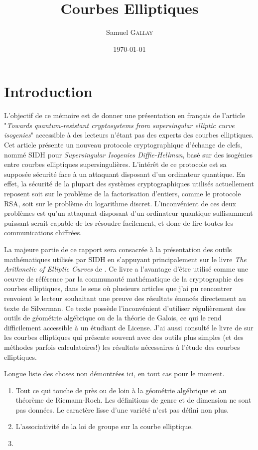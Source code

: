 \documentclass{article}
\title{Courbes Elliptiques}
\author{Samuel \textsc{Gallay}}
\date{\today}
\theoremstyle{plain}%
\theoremstyle{definition}%
\begin{document}
\maketitle

\tableofcontents

\newpage

\section{Introduction}


L'objectif de ce mémoire est de donner une présentation en français de l'article \cite{DeFeo} "\emph{Towards quantum-resistant cryptosystems from supersingular elliptic curve isogenies}" accessible à des lecteurs n'étant pas des experts des courbes elliptiques.
Cet article présente un nouveau protocole cryptographique d'échange de clefs, nommé SIDH pour \emph{Supersingular Isogenies Diffie-Hellman}, basé sur des isogénies entre courbes elliptiques supersingulières. 
L'intérêt de ce protocole est sa supposée sécurité face à un attaquant disposant d'un ordinateur quantique. 
En effet, la sécurité de la plupart des systèmes cryptographiques utilisés actuellement reposent soit sur le problème de la factorisation d'entiers, comme le protocole RSA, soit sur le problème du logarithme discret. 
L'inconvénient de ces deux problèmes est qu'un attaquant disposant d'un ordinateur quantique suffisamment puissant serait capable de les résoudre facilement, et donc de lire toutes les communications chiffrées.

La majeure partie de ce rapport sera consacrée à la présentation des outils mathématiques utilisés par SIDH en s'appuyant principalement sur le livre \emph{The Arithmetic of Elliptic Curves} de \cite{Silverman}. Ce livre a l'avantage d'être utilisé comme une oeuvre de référence par la communauté mathématique de la cryptographie des courbes elliptiques, dans le sens où plusieurs articles que j'ai pu rencontrer renvoient le lecteur souhaitant une preuve des résultats énoncés directement au texte de Silverman. Ce texte possède l'inconvénient d'utiliser régulièrement des outils de géométrie algébrique ou de la théorie de Galois, ce qui le rend difficilement accessible à un étudiant de License. J'ai aussi consulté le livre de \cite{Washington} sur les courbes elliptiques qui présente souvent avec des outils plus simples (et des méthodes parfois calculatoires!) les résultats nécessaires à l'étude des courbes elliptiques. 

\vspace{2em}
Longue liste des choses non démontrées ici, en tout cas pour le moment.
\begin{enumerate}
  \item Tout ce qui touche de près ou de loin à la géométrie algébrique et au théorème de Riemann-Roch. Les définitions de genre et de dimension ne sont pas données. Le caractère lisse d'une variété n'est pas défini non plus.
  \item L'associativité de la loi de groupe sur la courbe elliptique.
  \item 
\end{enumerate}
\end{document}
